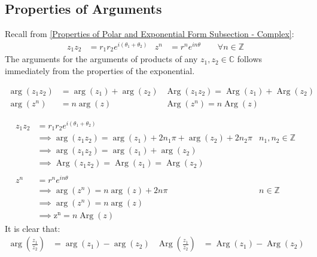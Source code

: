 \documentclass[12pt, english]{book}
\makeatletter
\renewenvironment{proof}[1][\proofname]{\par
	\pushQED{\qed}%
	\normalfont \topsep6\p@\@plus6\p@\relax
	\list{}{%
		\settowidth{\leftmargin}{\itshape\proofname:\hskip\labelsep}%
		\setlength{\labelwidth}{0pt}%
		\setlength{\itemindent}{-\leftmargin}%
		}%
	\item[\hskip\labelsep\itshape#1\@addpunct{:}]\ignorespaces
	}{\popQED\endlist\@endpefalse}
\makeatother
\begin{document}
	\subsection{Properties of Arguments} \label{Properties of Argumetns Subsection - Complex}
	Recall from \cref{Properties of Polar and Exponential Form Subsection - Complex}: 
	\begin{align*}
		z_1  z_2 &= r_1 r_2 e^{i(\theta_1 + \theta_2)} 
		& z^n &= r^n e^{i n \theta} \qquad \forall n \in \mathbb{Z}
	\end{align*}
	The arguments for the arguments of products of any $z_1, z_2 \in \mathbb{C}$ follows immediately from the properties of the exponential.
	\begin{corollary}
		\begin{align*}
			\arg(z_1 z_2) &= \arg(z_1) + \arg(z_2)
				& \operatorname{Arg}(z_1 z_2) = \operatorname{Arg}(z_1) + \operatorname{Arg}(z_2) \\
			\arg(z^n) &= n\arg(z)  
				& \operatorname{Arg}(z^n) = n\operatorname{Arg}(z)
		\end{align*}
		\label{Arguments of Products Corollary - Complex}
	\end{corollary}
	\begin{proof}
		\begin{align*}
			z_1  z_2 &= r_1 r_2 e^{i(\theta_1 + \theta_2)} & \\
			&\implies \arg(z_1 z_2) = \arg(z_1) + 2n_1 \pi + \arg(z_2) + 2n_2\pi
				& n_1, n_2 \in \mathbb{Z} \\
			&\implies \arg(z_1 z_2) = \arg(z_1) + \arg(z_2) & \\
			&\implies \operatorname{Arg}(z_1 z_2) = \operatorname{Arg}(z_1) = \operatorname{Arg}(z_2)  \\
			\\
			z^n &= r^n e^{i n\theta} & \\
			&\implies \arg(z^n) = n\arg(z) + 2n\pi & n \in \mathbb{Z} \\
			&\implies \arg(z^n) = n\arg(z)  \\
			&\implies \operatorname{z^n} = n\operatorname{Arg}(z)
		\end{align*}
	\end{proof}
	It is clear that: 
	\begin{align*}
		\arg\left(\frac{z_1}{z_2}\right) &= \arg(z_1) - \arg(z_2)
			& \operatorname{Arg}\left(\frac{z_1}{z_2}\right) &= \operatorname{Arg}(z_1) - \operatorname{Arg}(z_2)
	\end{align*}
\end{document}
